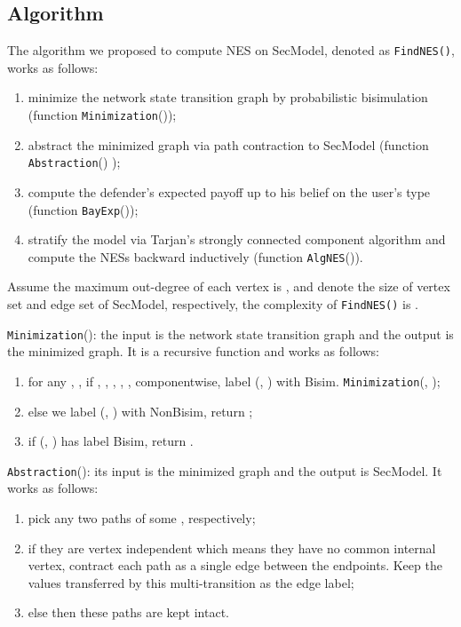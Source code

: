 \documentclass[10pt, conference, compsocconf]{IEEEtran}
\begin{document}
\subsection{Algorithm}
The algorithm we proposed to compute NES on SecModel, denoted as \verb"FindNES()", works as follows:
\begin{enumerate}[1]
\item minimize the network state transition graph by probabilistic bisimulation (function \verb"Minimization"());
\item abstract the minimized graph via path contraction to SecModel (function \verb"Abstraction"() );
\item compute the defender's expected payoff up to his belief on the user's type (function \verb"BayExp"());
\item stratify the model via Tarjan's strongly connected component algorithm \cite{reinhard} and compute the NESs backward inductively (function \verb"AlgNES"()).
\end{enumerate}

Assume the maximum out-degree of each vertex is ,  and  denote the size of vertex set and edge set of SecModel, respectively, the complexity of \verb"FindNES()" is .

\verb"Minimization"():
the input is the network state transition graph and the output is the minimized graph. It is a recursive function and works as follows:
\begin{enumerate}[1]
\item for any , , if , , , ,  ,  componentwise, label (, ) with {\rm Bisim}. \verb"Minimization"(, );
\item else we label (, ) with {\rm NonBisim}, return ;
\item if (, ) has label {\rm Bisim}, return .
\end{enumerate}

\verb"Abstraction"():
its input is the minimized graph and the output is SecModel. It works as follows:
\begin{enumerate}[1]
\item pick any two paths of some , respectively;
\item if they are vertex independent which means they have no common internal vertex, contract each path as a single edge between the endpoints.
    Keep the values transferred by this multi-transition as the edge label;
\item else then these paths are kept intact.
\end{enumerate}
\end{document}
